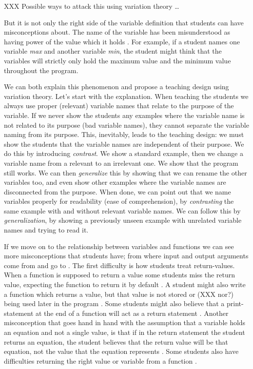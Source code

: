 XXX Possible ways to attack this using variation theory \dots

But it is not only the right side of the variable definition that students can 
have misconceptions about. The name of the variable has been misunderstood as 
having power of the value which it holds 
\parencite{MisconceptionsSurvey2017,Sleeman1984}. For example, if a student 
names one variable \emph{max} and another variable \emph{min}, the student 
might think that the variables will strictly only hold the maximum value and 
the minimum value throughout the program. 

We can both explain this phenomenon and propose a teaching design using 
variation theory.
Let's start with the explanation.
When teaching the students we always use proper (\ie relevant) variable names 
that relate to the purpose of the variable.
If we never show the students any examples where the variable name is not 
related to its purpose (bad variable names), they cannot separate the variable 
naming from its purpose.
This, inevitably, leads to the teaching design:
we must show the students that the variable names are independent of their 
purpose.
We do this by introducing \emph{contrast}.
We show a standard example, then we change a variable name from a relevant to 
an irrelevant one.
We show that the program still works.
We can then \emph{generalize} this by showing that we can rename the other 
variables too, and even show other examples where the variable names are 
disconnected from the purpose.
When done, we can point out that we name variables properly for readability 
(ease of comprehension), by \emph{contrasting} the same example with and 
without relevant variable names.
We can follow this by \emph{generalization}, by showing a previously unseen 
example with unrelated variable names and trying to read it.

If we move on to the relationship between variables and functions we can see 
more misconceptions that students have; from where input and output arguments 
come from and go to \parencite{Ragonis2005OOP}.
The first difficulty is how students treat return-values. When a function is 
supposed to return a value some students miss the return value, expecting the 
function to return it by default \parencite{Kurvinen2016,KumarVeerasamy2016}.
A student might also write a function which returns a value, but that value is 
not stored or (XXX nor?) being used later in the program 
\parencite{AltadmriBrown2015}.
Some students might also believe that a print-statement at the end of a 
function will act as a return statement \parencite{MisconceptionsSurvey2017}. 
Another misconception that goes hand in hand with the assumption that a 
variable holds an equation and not a single value, is that if in the return 
statement the student returns an equation, the student believes that the return 
value will be that equation, not the value that the equation represents 
\parencite{Kohn2017VariableEvaluation}. Some students also have difficulties 
returning the right value or variable from a function 
\parencite{KumarVeerasamy2016}. 

